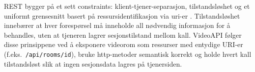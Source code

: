 
REST bygger på et sett \gls{constraints}: klient-tjener-separasjon, tilstandsløshet og et uniformt grensesnitt basert på ressursidentifikasjon via \gls{uri}-er \cite{fielding2000}. Tilstandsløshet innebærer at hver forespørsel må inneholde all nødvendig informasjon for å behandles, uten at tjeneren lagrer sesjonstilstand mellom kall. VideoAPI følger disse prinsippene ved å eksponere videorom som ressurser med entydige URI-er (f.eks.\ \texttt{/api/rooms/{id}}), bruke \gls{http}-metoder semantisk korrekt og holde hvert kall tilstandsløst slik at ingen sesjonsdata lagres på tjenersiden.